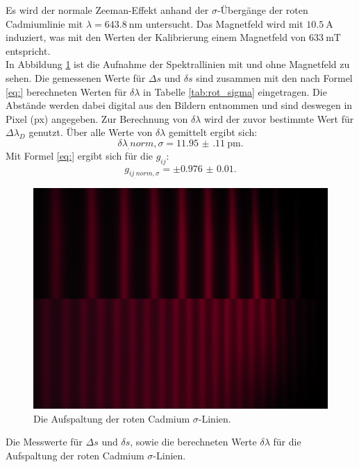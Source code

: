 Es wird der normale Zeeman-Effekt anhand der $\sigma$-Übergänge der roten Cadmiumlinie mit $\lambda=\SI{643.8}{\nano\metre}$ untersucht. Das Magnetfeld wird mit $\SI{10.5}{\ampere}$ induziert, was mit den Werten der Kalibrierung einem Magnetfeld von $\SI{633}{\milli\tesla}$ entspricht.\\
In Abbildung \ref{fig:rot_sigma} ist die Aufnahme der Spektrallinien mit und ohne Magnetfeld zu sehen. Die gemessenen Werte für $\Delta s$ und $\delta s$ sind zusammen mit den nach Formel \eqref{eq:} berechneten Werten für $\delta\lambda$ in Tabelle \ref{tab:rot_sigma} eingetragen. Die Abstände werden dabei digital aus den Bildern entnommen und sind deswegen in Pixel (px) angegeben. Zur Berechnung von $\delta\lambda$ wird der zuvor bestimmte Wert für $\Delta\lambda_D$ genutzt.
Über alle Werte von $\delta\lambda$ gemittelt ergibt sich:
\[
\delta\lambda_.{norm,\sigma} = \SI{11.95(11)}{\pico\metre}\text{.}
\]
Mit Formel \eqref{eq:} ergibt sich für die $g_{ij}$:
\[
g_{ij_.{norm,\sigma}} = \pm\num{0.976(10)}\text{.}
\]

\begin{figure}
	\centering
	\includegraphics[width=\linewidth-130pt,height=\textheight-130pt,keepaspectratio]{content/images/rot_sigma.jpg}
	\caption{Die Aufspaltung der roten Cadmium $\sigma$-Linien.}
	\label{fig:rot_sigma}
\end{figure}

\begin{table}
	\centering
	\caption{Die Messwerte für $\Delta s$ und $\delta s$, sowie die berechneten Werte $\delta\lambda$ für die Aufspaltung der roten Cadmium $\sigma$-Linien.}
	
	\label{tab:rot_sigma}
\end{table}

